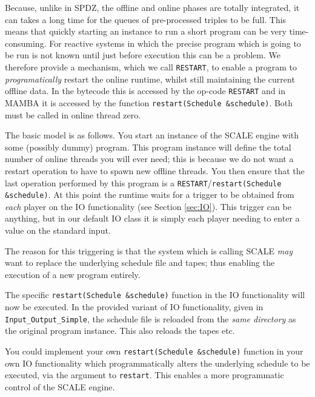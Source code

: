 \label{sec:restart}
Because, unlike in SPDZ, the offline and online phases are totally
integrated, it can takes a long time for the queues of pre-processed
triples to be full. This means that quickly starting an instance to
run a short program can be very time-consuming. For reactive systems
in which the precise program which is going to be run is not known
until just before execution this can be a problem.
We therefore provide a mechanism, which we call \verb+RESTART+, to
enable a program to {\em programatically} restart the online runtime, whilst 
still maintaining the current offline data.
In the bytecode this is accessed by the op-code \verb+RESTART+
and in MAMBA it is accessed by the function \verb+restart(Schedule &schedule)+.
Both must be called in online thread zero.

The basic model is as follows.
You start an instance of the SCALE engine with some (possibly
dummy) program. This program instance will define the total number
of online threads you will ever need; this is because we do not
want a restart operation to have to spawn new offline threads.
You then ensure that the last operation performed by this
program is a \verb+RESTART+/\verb+restart(Schedule &schedule)+.
At this point the runtime waits for a trigger to be obtained
from {\em each} player on the IO functionality (see
Section \ref{sec:IO}).
This trigger can be anything, but in our default IO class it
is simply each player needing to enter a value on the standard
input.

The reason for this triggering is that the system which is
calling SCALE {\em may} want to replace the underlying
schedule file and tapes; thus enabling the execution of
a new program entirely.

The specific \verb+restart(Schedule &schedule)+ function in the  
IO functionality will now be executed.
In the provided variant of IO functionality, given in
\verb+Input_Output_Simple+, the schedule file is reloaded 
from the {\em same directory} as the original program instance.
This also reloads the tapes etc.

You could implement your own \verb+restart(Schedule &schedule)+ function in your
own IO functionality which programmatically alters
the underlying schedule to be executed, via the argument to \verb+restart+. 
This enables a more programmatic control of the SCALE engine.

